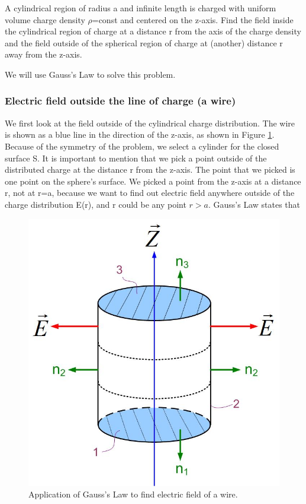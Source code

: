 \documentclass{ximera}
\begin{document}
A cylindrical region of radius a and infinite length is charged with uniform volume charge density $\rho$=const and centered on the z-axis. Find the field inside the cylindrical region of charge at a distance r from the axis of the charge density and the field outside of the spherical region of charge at (another) distance r away from the z-axis.

We will use Gauss's Law to solve this problem.



\subsubsection{Electric field outside the line of charge (a wire)}



 We first look at the field outside of the cylindrical charge distribution. The wire is shown as a blue line in the direction of the z-axis, as shown in Figure \ref{fig:gaussLineOut}.  Because of the symmetry of the problem, we select a cylinder for the closed surface S. It is important to mention that we pick a point outside of the distributed charge at the distance r from the z-axis. The point that we picked is one point on the sphere's surface. We picked a point from the z-axis at a distance r, not at r=a, because we want to find out electric field anywhere outside of the charge distribution E(r), and r could be any point $r>a$. Gauss's Law states that 



\begin{figure}[htbp]
\begin{center}
\includegraphics[scale=0.5]{../jpg/gausslawcylinder.jpg}
\end{center}
\caption{Application of Gauss's Law to find electric field of a wire.}
\label{fig:gaussLineOut}
\end{figure}
\end{document}
